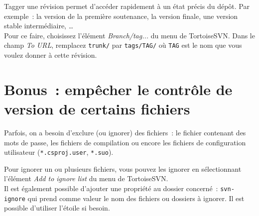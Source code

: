 Tagger une révision permet d'accéder rapidement à un état précis du dépôt. Par exemple~: la version de la première soutenance, la version finale, une version stable intermédiaire, \ldots\\

Pour ce faire, choisissez l'élément \emph{Branch/tag...} du menu de TortoiseSVN. Dans le champ \emph{To URL}, remplacez \texttt{trunk/} par \texttt{tags/TAG/} où \texttt{TAG} est le nom que vous voulez donner à cette révision.

\section{Bonus~: empêcher le contrôle de version de certains fichiers}

Parfois, on a besoin d'exclure (ou ignorer) des fichiers~: le fichier contenant des mots de passe, les fichiers de compilation ou encore les fichiers de configuration utilisateur (\texttt{*.csproj.user}, \texttt{*.suo}).


Pour ignorer un ou plusieurs fichiers, vous pouvez les ignorer en sélectionnant l'élément \emph{Add to ignore list} du menu de TortoiseSVN.\\

Il est également possible d'ajouter une propriété \svn{} au dossier concerné~: \texttt{svn-ignore} qui prend comme valeur le nom des fichiers ou dossiers à ignorer. Il est possible d'utiliser l'étoile si besoin.